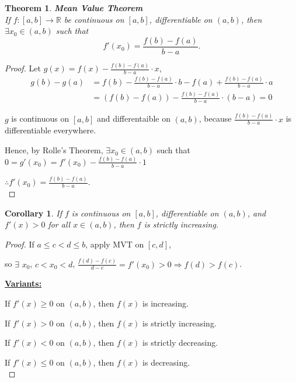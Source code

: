 \documentclass[12pt]{article}
\theoremstyle{plain}
\newtheorem{theorem}{Theorem}[subsection]
\newtheorem{corollary}{Corollary}[subsection]
\begin{document}
    \begin{theorem}{\textbf{Mean Value Theorem}}\\
        If $f:[a,b] \to \mathbb{R}$ be continuous on $[a,b]$, differentiable 
        on $(a,b)$, 
        then $\exists x_0 \in (a,b)$ such that 
        \[
					f'(x_0) = \frac{f(b)-f(a)}{b-a}.
				\]
    \end{theorem}
    \begin{proof}
        Let $g(x) = f(x) - \frac{f(b) - f(a)} { b-a} \cdot x$,
        \begin{align*}
				g(b) - g(a)
				&= f(b) - \frac {f(b) - f(a)}{b-a} \cdot b
						-f(a) + \frac {f(b)-f(a)}{b-a} \cdot a \\
				&= (f(b) - f(a))-\frac{f(b)-f(a)}{b-a}\cdot (b-a)
				=0
				\end{align*}
				
			$g$ is continuous on $[a,b]$ and differentaible on $(a,b)$, 
			because $\frac{f(b)-f(a)}{b-a}\cdot x$ is differentiable everywhere. 

			Hence, by Rolle's Theorem, $\exists x_0\in(a,b)$ such that
			$0 = g'(x_0) = f'(x_0) -\frac{f(b)-f(a)}{b-a} \cdot 1$

			$\therefore f'(x_0) = \frac {f(b)-f(a)}{b-a}$. \\
    \end{proof}

    
    \begin{corollary}
    	If $f$ is continuous on $[a,b]$, differentiable on $(a,b)$, 
    	and $f'(x) > 0$ for all $x\in(a,b)$,
    	then $f$ is strictly increasing.
    \end{corollary}
    \begin{proof}
        If $a\leq c<d\leq b$, apply MVT on $[c,d]$, 

        so $\exists\,\, x_0$, $c<x_0<d$,
        $\frac{f(d)-f(c)}{d-c} = f'(x_0)>0 \Rightarrow f(d)>f(c)$.

        \underline {\textbf{Variants:}}

        If $f'(x) \geq 0$ on $(a,b)$, then $f(x)$ is increasing.

        If $f'(x) > 0$ on $(a,b)$, then $f(x)$ is strictly increasing. 

        If $f'(x) < 0$ on $(a,b)$, then $f(x)$ is strictly decreasing. 

        If $f'(x) \leq 0$ on $(a,b)$, then $f(x)$ is decreasing.  \\
    \end{proof}
\end{document}
